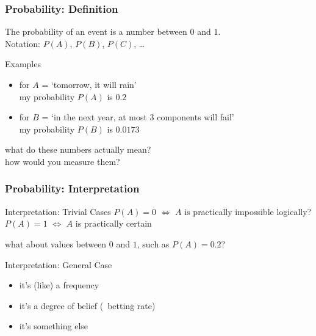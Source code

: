 \documentclass{beamer}
\newcommand{\play}{\structure{$\blacktriangleright$}}
\begin{document}
\begin{frame}
  \frametitle{Probability: Definition}
  \begin{definition}
    The \alert{probability of an event} is a number between $0$ and $1$.
    \\[1ex]
    Notation: $P(A)$, $P(B)$, $P(C)$, \dots
  \end{definition}
  \begin{exampleblock}{Examples}
    \begin{itemize}
    \item for $A$ = `tomorrow, it will rain' \\
      my probability $P(A)$ is $0.2$
    \item for $B$ = `in the next year, at most 3 components will fail' \\
      my probability $P(B)$ is $0.0173$
    \end{itemize}
  \end{exampleblock}
  \begin{alertblock}{}
    what do these numbers actually mean? \\
    how would you measure them?
  \end{alertblock}
\end{frame}

\begin{frame}
  \frametitle{Probability: Interpretation}
  \begin{block}{Interpretation: Trivial Cases}
    $P(A)=0$ $\iff$ $A$ is practically impossible {\hfill \scriptsize logically?}\\
    $P(A)=1$ $\iff$ $A$ is practically certain
  \end{block}
  \begin{alertblock}{}
    what about values between $0$ and $1$, such as $P(A)=0.2$?
  \end{alertblock}
  \begin{block}{Interpretation: General Case}
    \begin{itemize}
    \item it's (like) a \alert{frequency}
    \item it's a degree of belief (\play\ \alert{betting rate})
    \item it's something else
    \end{itemize}
  \end{block}
\end{frame}
\end{document}
